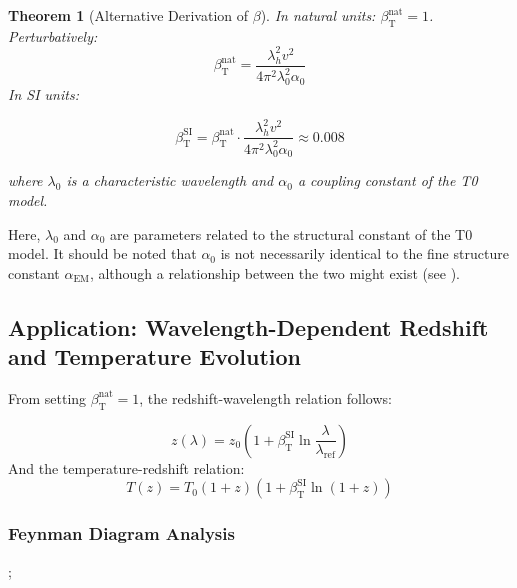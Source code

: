 ﻿\documentclass[12pt,a4paper]{article}
\newcommand{\alphaEM}{\alpha_{\text{EM}}}
\newcommand{\betaT}{\beta_{\text{T}}}
\newtheorem{theorem}{Theorem}[section]
\begin{document}
	\begin{theorem}[Alternative Derivation of \(\beta\)]
		In natural units: \(\betaT^{\text{nat}} = 1\). Perturbatively:
		\begin{equation}
			\betaT^{\text{nat}} = \frac{\lambda_h^2 v^2}{4\pi^2 \lambda_0^2 \alpha_0}
		\end{equation}
		In SI units:
		
		\begin{equation}
			\betaT^{\text{SI}} = \betaT^{\text{nat}} \cdot \frac{\lambda_h^2 v^2}{4\pi^2 \lambda_0^2 \alpha_0} \approx 0.008
		\end{equation}	
		
		where \(\lambda_0\) is a characteristic wavelength and \(\alpha_0\) a coupling constant of the T0 model.
	\end{theorem}
	
	Here, \(\lambda_0\) and \(\alpha_0\) are parameters related to the structural constant of the T0 model. It should be noted that \(\alpha_0\) is not necessarily identical to the fine structure constant \(\alphaEM\), although a relationship between the two might exist (see \cite{pascher_alphabeta_2025}).
	
	\subsection{Application: Wavelength-Dependent Redshift and Temperature Evolution}
	
	From setting \(\betaT^{\text{nat}} = 1\), the redshift-wavelength relation follows:
	
	\begin{equation}
		z(\lambda) = z_0 \left(1 + \betaT^{\text{SI}} \ln \frac{\lambda}{\lambda_{\text{ref}}}\right)
	\end{equation}
	And the temperature-redshift relation:
	\begin{equation}
		T(z) = T_0 (1 + z) (1 + \betaT^{\text{SI}} \ln(1 + z))
	\end{equation}
	
	\subsubsection{Feynman Diagram Analysis}
	
	\begin{center}
		;
	\end{center}
	
\end{document}

